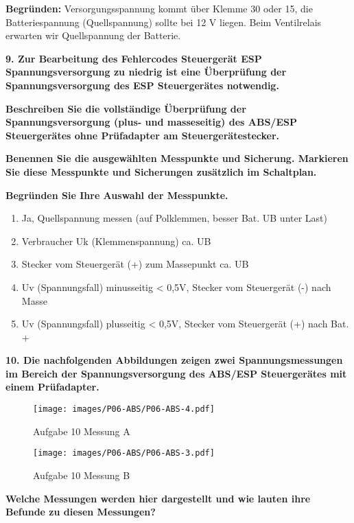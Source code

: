 \textbf{Begründen:} Versorgungsspannung kommt über Klemme 30 oder 15,
die Batteriespannung (Quellspannung) sollte bei 12 V liegen. Beim
Ventilrelais erwarten wir Quellspannung der Batterie.

\newpage

\textbf{9. Zur Bearbeitung des Fehlercodes Steuergerät ESP
Spannungsversorgung zu niedrig ist eine Überprüfung der
Spannungsversorgung des ESP Steuergerätes notwendig.}

\textbf{Beschreiben Sie die vollständige Überprüfung der
Spannungsversorgung (plus- und masseseitig) des ABS/ESP Steuergerätes
ohne Prüfadapter am Steuergerätestecker.}

\textbf{Benennen Sie die ausgewählten Messpunkte und Sicherung.
Markieren Sie diese Messpunkte und Sicherungen zusätzlich im
Schaltplan.}

\textbf{Begründen Sie Ihre Auswahl der Messpunkte.}

\begin{enumerate}
\item
  Ja, Quellspannung messen (auf Polklemmen, besser Bat. UB unter Last)
\item
  Verbraucher Uk (Klemmenspannung) ca. UB
\item
  Stecker vom Steuergerät (+) zum Massepunkt ca. UB
\item
  Uv (Spannungsfall) minusseitig \textless{} 0,5V, Stecker vom
  Steuergerät (-) nach Masse
\item
  Uv (Spannungsfall) plusseitig \textless{} 0,5V, Stecker vom
  Steuergerät (+) nach Bat. +
\end{enumerate}

\newpage

\textbf{10. Die nachfolgenden Abbildungen zeigen zwei Spannungsmessungen
im Bereich der Spannungsversorgung des ABS/ESP Steuergerätes mit einem
Prüfadapter.}

\begin{figure}[!ht]%
\centering
\texttt{[image: images/P06-ABS/P06-ABS-4.pdf]}
\caption{Aufgabe 10 Messung A}
\end{figure}

\begin{figure}[!ht]%
\centering
\texttt{[image: images/P06-ABS/P06-ABS-3.pdf]}
\caption{Aufgabe 10 Messung B}
\end{figure}

\textbf{Welche Messungen werden hier dargestellt und wie lauten ihre
Befunde zu diesen Messungen?}

